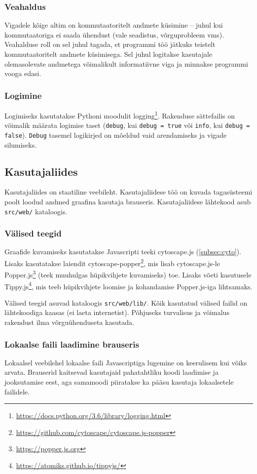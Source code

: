 \documentclass[12pt]{article}
\begin{document}
\subsubsection{Veahaldus}
Vigadele kõige altim on kommutaatoritelt andmete küsimine -- juhul kui kommutaatoriga ei saada
ühendust (vale seadistus, võrguprobleem vms).
Veahalduse roll on sel juhul tagada, et programmi töö jätkuks teistelt kommutaatoritelt andmete
küsimisega.
Sel juhul logitakse kasutajale olemasolevate andmetega võimalikult informatiivne viga ja minnakse
programmi vooga edasi.

\subsubsection{Logimine} \label{logging}
Logimiseks kasutatakse Pythoni moodulit
logging\footnote{\url{https://docs.python.org/3.6/library/logging.html}}.
Rakenduse sättefailis on võimalik määrata logimise taset (\texttt{debug},
kui \texttt{debug = true} või \texttt{info}, kui \texttt{debug = false}).
\texttt{Debug} tasemel logikirjed on mõeldud vaid arendamiseks ja vigade silumiseks.


\subsection{Kasutajaliides}
Kasutajaliides on staatiline veebileht.
Kasutajaliidese töö on kuvada tagasüsteemi poolt loodud andmed graafina kasutaja brauseris.
Kasutajaliidese lähtekood asub \texttt{src/web/} kataloogis.

\subsubsection{Välised teegid} \label{libsUsedInUI}
Graafide kuvamiseks kasutatakse Javascripti teeki cytoscape.js (\ref{subsec:cyto}).
Lisaks kasutatakse laiendit
cytoscape-popper\footnote{\url{https://github.com/cytoscape/cytoscape.js-popper}}, mis lisab
cytoscape.js-le Popper.js\footnote{\url{https://popper.js.org}} (teek muuhulgas hüpikvihjete
kuvamiseks) toe.
Lisaks võeti kasutusele Tippy.js\footnote{\url{https://atomiks.github.io/tippyjs/}},
mis teeb hüpikvihjete loomise ja kohandamise Popper.js-iga lihtsamaks.

Välised teegid asuvad kataloogis \texttt{src/web/lib/}.
Kõik kasutatud välised failid on lähtekoodiga kaasas (ei laeta internetist).
Põhjuseks turvalisus ja võimalus rakendust ilma võrguühenduseta kasutada.

\subsubsection{Lokaalse faili laadimine brauseris}
Lokaalsel veebilehel lokaalse faili Javascriptiga lugemine on keerulisem kui võiks arvata.
Brauserid kaitsevad kasutajaid pahatahtliku koodi laadimise ja jooksutamise eest, aga samamoodi
piiratakse ka pääsu kasutaja lokaalsetele failidele.
\end{document}
